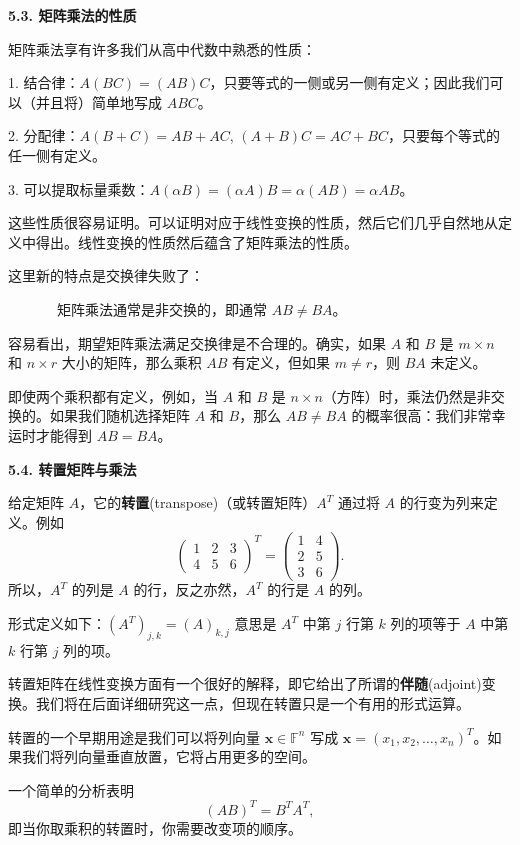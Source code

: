 \textbf{5.3. 矩阵乘法的性质}

矩阵乘法享有许多我们从高中代数中熟悉的性质：

1. 结合律：$A(BC) = (AB)C$，只要等式的一侧或另一侧有定义；因此我们可以（并且将）简单地写成 $ABC$。

2. 分配律：$A(B + C) = AB + AC$, $(A + B)C = AC + BC$，只要每个等式的任一侧有定义。

3. 可以提取标量乘数：$A(\alpha B) = (\alpha A) B = \alpha (AB) = \alpha AB$。

这些性质很容易证明。可以证明对应于线性变换的性质，然后它们几乎自然地从定义中得出。线性变换的性质然后蕴含了矩阵乘法的性质。

这里新的特点是交换律失败了：

~~~~~~~矩阵乘法通常是非交换的，即通常 $AB \neq BA$。

容易看出，期望矩阵乘法满足交换律是不合理的。确实，如果 $A$ 和 $B$ 是 $m \times n$ 和 $n \times r$ 大小的矩阵，那么乘积 $AB$ 有定义，但如果 $m \neq r$，则 $BA$ 未定义。

即使两个乘积都有定义，例如，当 $A$ 和 $B$ 是 $n \times n$（方阵）时，乘法仍然是非交换的。如果我们随机选择矩阵 $A$ 和 $B$，那么 $AB \neq BA$ 的概率很高：我们非常幸运时才能得到 $AB = BA$。

\textbf{5.4. 转置矩阵与乘法}

给定矩阵 $A$，它的\textbf{转置}(transpose)（或转置矩阵）$A^T$ 通过将 $A$ 的行变为列来定义。例如
$$
\begin{pmatrix} 1 & 2 & 3 \\ 4 & 5 & 6 \end{pmatrix}^T = \begin{pmatrix} 1 & 4 \\ 2 & 5 \\ 3 & 6 \end{pmatrix}.
$$
所以，$A^T$ 的列是 $A$ 的行，反之亦然，$A^T$ 的行是 $A$ 的列。

形式定义如下：$(A^T)_{j,k} = (A)_{k,j}$ 意思是 $A^T$ 中第 $j$ 行第 $k$ 列的项等于 $A$ 中第 $k$ 行第 $j$ 列的项。

转置矩阵在线性变换方面有一个很好的解释，即它给出了所谓的\textbf{伴随}(adjoint)变换。我们将在后面详细研究这一点，但现在转置只是一个有用的形式运算。

转置的一个早期用途是我们可以将列向量 $\mathbf{x} \in \mathbb{F}^n$ 写成 $\mathbf{x} = (x_1, x_2, \dots, x_n)^T$。如果我们将列向量垂直放置，它将占用更多的空间。

一个简单的分析表明 $$(AB)^T = B^T A^T,$$
即当你取乘积的转置时，你需要改变项的顺序。

